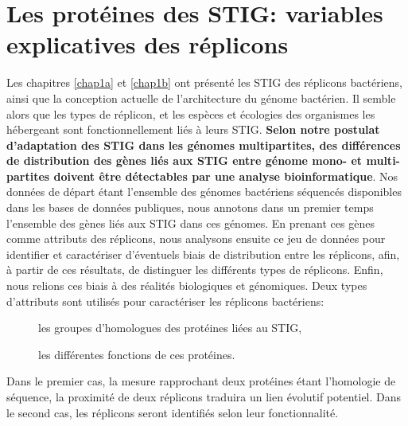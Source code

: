 \section{Les protéines des STIG: variables explicatives des réplicons}\label{parchap2introworkflow}
Les chapitres \ref{chap1a} et \ref{chap1b} ont présenté les STIG des réplicons bactériens, ainsi que la conception actuelle de l'architecture du génome bactérien. Il semble alors que les types de réplicon, et les espèces et écologies des organismes les hébergeant sont fonctionnellement liés à leurs STIG. \textbf{Selon notre postulat d'adaptation des STIG dans les génomes multipartites, des différences de distribution des gènes liés aux STIG entre génome mono- et multi-partites doivent être détectables par une analyse bioinformatique}. Nos données de départ étant l'ensemble des génomes bactériens séquencés disponibles dans les bases de données publiques, nous annotons dans un premier temps l'ensemble des gènes liés aux STIG dans ces génomes. En prenant ces gènes comme attributs des réplicons, nous analysons ensuite ce jeu de données pour identifier et caractériser d'éventuels biais de distribution entre les réplicons, afin, à partir de ces résultats, de distinguer les différents types de réplicons. Enfin, nous relions ces biais à des réalités biologiques et génomiques.
Deux types d'attributs sont utilisés pour caractériser les réplicons bactériens:
\begin{description}
\item[\textbullet]les groupes d'homologues des protéines liées au STIG, 
\item[\textbullet]les différentes fonctions de ces protéines.
\end{description}
Dans le premier cas, la mesure rapprochant deux protéines étant l'homologie de séquence, la proximité de deux réplicons traduira un lien évolutif potentiel. Dans le second cas, les réplicons seront identifiés selon leur fonctionnalité.

